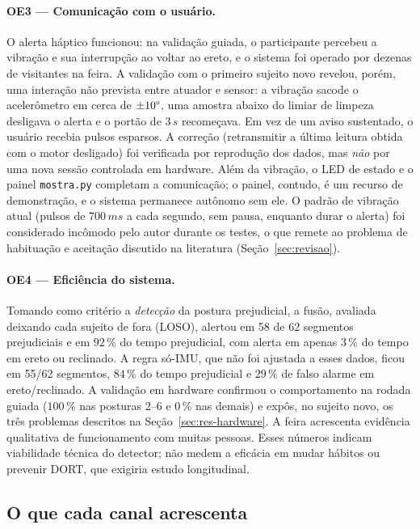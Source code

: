 \paragraph{OE3 --- Comunicação com o usuário.}
O alerta háptico funcionou: na validação guiada, o participante percebeu a
vibração e sua interrupção ao voltar ao ereto, e o sistema foi operado por
dezenas de visitantes na feira. A validação com o primeiro sujeito novo
revelou, porém, uma interação não prevista entre atuador e sensor: a vibração
sacode o acelerômetro em cerca de $\pm10\degree{}$, uma amostra abaixo do
limiar de limpeza desligava o alerta e o portão de $3\,s$ recomeçava. Em vez
de um aviso sustentado, o usuário recebia pulsos esparsos. A correção
(retransmitir a última leitura obtida com o motor desligado) foi verificada
por reprodução dos dados, mas \emph{não} por uma nova sessão controlada em
hardware. Além da vibração, o LED de estado e o painel \texttt{mostra.py}
completam a comunicação; o painel, contudo, é um recurso de demonstração, e o
sistema permanece autônomo sem ele. O padrão de vibração atual (pulsos
de $700\,ms$ a cada segundo, sem pausa, enquanto durar o alerta) foi
considerado incômodo pelo autor durante os testes, o que remete ao problema de habituação e aceitação discutido na
literatura (Seção~\ref{sec:revisao}).

\paragraph{OE4 --- Eficiência do sistema.}
Tomando como critério a \emph{detecção} da postura prejudicial, a fusão,
avaliada deixando cada sujeito de fora (LOSO), alertou em 58 de 62 segmentos
prejudiciais e em $92\,\%$ do tempo prejudicial, com alerta em apenas $3\,\%$
do tempo em ereto ou reclinado. A regra só-IMU, que não foi ajustada a esses
dados, ficou em 55/62 segmentos, $84\,\%$ do tempo prejudicial e $29\,\%$ de
falso alarme em ereto/reclinado. A validação em hardware confirmou o
comportamento na rodada guiada ($100\,\%$ nas posturas 2--6 e $0\,\%$ nas
demais) e expôs, no sujeito novo, os três problemas descritos na
Seção~\ref{sec:res-hardware}. A feira acrescenta evidência qualitativa de
funcionamento com muitas pessoas. Esses números indicam viabilidade técnica
do detector; não medem a eficácia em mudar hábitos ou prevenir DORT, que
exigiria estudo longitudinal.

\subsection{O que cada canal acrescenta}
\label{sec:dis-fusao}

